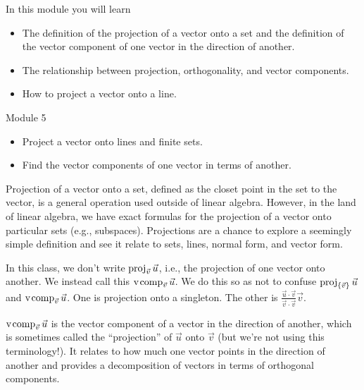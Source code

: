 \begin{module}

	In this module you will learn
	\begin{itemize}
		\item The definition of the projection of a vector onto a set and the definition of the vector component of one vector
			in the direction of another.
		\item The relationship between projection, orthogonality, and vector components.
		\item How to project a vector onto a line.
	\end{itemize}

	
	

\end{module}
\begin{lesson}

	Module 5

	\begin{itemize}
		\item Project a vector onto lines and finite sets.
		\item Find the vector components of one vector in terms of another.
	\end{itemize}

	Projection of a vector onto a set, defined as the closet point in the
	set to the vector, is a general operation used outside of linear algebra.
	However, in the land of linear algebra, we have exact formulas for the
	projection of a vector onto particular sets (e.g., subspaces).
	Projections are a chance to explore a seemingly simple definition
	and see it relate to sets, lines, normal form, and vector form.

	\begin{annotation}
		\begin{notes}
			In this class, we don't write $\operatorname{proj}_{\vec v}\vec u$,
			i.e., the projection of one vector onto another. We
			instead call this $\operatorname{\operatorname{v\hspace{1pt}comp}}_{\vec v}\vec u$. We do this so
			as not to confuse $\operatorname{proj}_{\{\vec v\}}\vec u$ and
			$\operatorname{\operatorname{v\hspace{1pt}comp}}_{\vec v}\vec u$. One is projection onto a singleton.
			The other is $\frac{\vec u\cdot \vec v}{\vec v\cdot \vec v}\vec v$.
		\end{notes}
	\end{annotation}
	$\operatorname{\operatorname{v\hspace{1pt}comp}}_{\vec v}\vec u$ is the vector component of a vector in the direction of another,
	which is sometimes called the ``projection'' of $\vec u$ onto $\vec v$ (but we're not using
	this terminology!). It relates
	to how much one vector points in the direction of another and
	provides a decomposition of vectors in terms of orthogonal components.


\end{lesson}
	\bookonlynewpage
